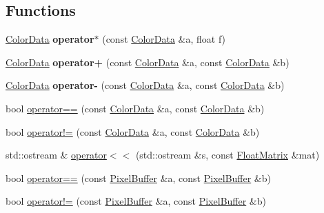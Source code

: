 \subsection*{Functions}
\begin{DoxyCompactItemize}
\item 
\mbox{\label{namespaceimage__tools_a392bdb9c8c1a79ddbbc566804056a337}} 
\hyperlink{classimage__tools_1_1ColorData}{Color\+Data} {\bfseries operator$\ast$} (const \hyperlink{classimage__tools_1_1ColorData}{Color\+Data} \&a, float f)
\item 
\mbox{\label{namespaceimage__tools_a0cab1b6db65185705d2e030161007aec}} 
\hyperlink{classimage__tools_1_1ColorData}{Color\+Data} {\bfseries operator+} (const \hyperlink{classimage__tools_1_1ColorData}{Color\+Data} \&a, const \hyperlink{classimage__tools_1_1ColorData}{Color\+Data} \&b)
\item 
\mbox{\label{namespaceimage__tools_a3db352de82165af3d4a29bec2a23f8f5}} 
\hyperlink{classimage__tools_1_1ColorData}{Color\+Data} {\bfseries operator-\/} (const \hyperlink{classimage__tools_1_1ColorData}{Color\+Data} \&a, const \hyperlink{classimage__tools_1_1ColorData}{Color\+Data} \&b)
\item 
bool \hyperlink{namespaceimage__tools_aa86e60308b4cc57bddad07333db1e2ea}{operator==} (const \hyperlink{classimage__tools_1_1ColorData}{Color\+Data} \&a, const \hyperlink{classimage__tools_1_1ColorData}{Color\+Data} \&b)
\item 
bool \hyperlink{namespaceimage__tools_a4d76364575359c17c22e874013a89c4d}{operator!=} (const \hyperlink{classimage__tools_1_1ColorData}{Color\+Data} \&a, const \hyperlink{classimage__tools_1_1ColorData}{Color\+Data} \&b)
\item 
std\+::ostream \& \hyperlink{namespaceimage__tools_ae217665b898f2dec652e5ea51d0eb206}{operator$<$$<$} (std\+::ostream \&s, const \hyperlink{classimage__tools_1_1FloatMatrix}{Float\+Matrix} \&mat)
\item 
bool \hyperlink{namespaceimage__tools_af0bb4576a83b836cfec760b95aee081c}{operator==} (const \hyperlink{classimage__tools_1_1PixelBuffer}{Pixel\+Buffer} \&a, const \hyperlink{classimage__tools_1_1PixelBuffer}{Pixel\+Buffer} \&b)
\item 
bool \hyperlink{namespaceimage__tools_a83c5e53f2317f61ef03f91ca667145cf}{operator!=} (const \hyperlink{classimage__tools_1_1PixelBuffer}{Pixel\+Buffer} \&a, const \hyperlink{classimage__tools_1_1PixelBuffer}{Pixel\+Buffer} \&b)
\end{DoxyCompactItemize}


